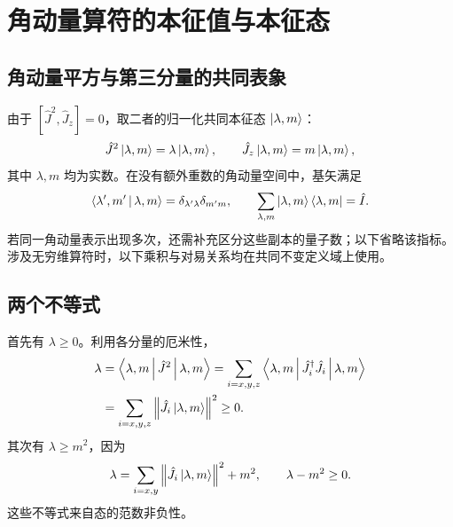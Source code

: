 \section{角动量算符的本征值与本征态}
\subsection{角动量平方与第三分量的共同表象}
由于 $\left[\hat J^2,\hat J_z\right]=0$，取二者的归一化共同本征态 $\Ket{\lambda,m}$：
\begin{equation}
\hat J^2\Ket{\lambda,m}=\lambda\Ket{\lambda,m},\qquad
\hat J_z\Ket{\lambda,m}=m\Ket{\lambda,m},
\end{equation}
其中 $\lambda,m$ 均为实数。在没有额外重数的角动量空间中，基矢满足
\begin{equation}
\Braket{\lambda',m'|\lambda,m}=\delta_{\lambda'\lambda}\delta_{m'm},\qquad
\sum_{\lambda,m}\Ket{\lambda,m}\Bra{\lambda,m}=\hat I.
\end{equation}
若同一角动量表示出现多次，还需补充区分这些副本的量子数；以下省略该指标。涉及无穷维算符时，以下乘积与对易关系均在共同不变定义域上使用。

\subsection{两个不等式}
首先有 $\lambda\geq0$。利用各分量的厄米性，
\begin{align}
\lambda&=\Braket{\lambda,m|\hat J^2|\lambda,m}
=\sum_{i=x,y,z}\Braket{\lambda,m|\hat J_i^\dag\hat J_i|\lambda,m}\notag\\
&=\sum_{i=x,y,z}\left\|\hat J_i\Ket{\lambda,m}\right\|^2\geq0.
\end{align}
其次有 $\lambda\geq m^2$，因为
\begin{equation}
\lambda=\sum_{i=x,y}\left\|\hat J_i\Ket{\lambda,m}\right\|^2+m^2,
\qquad\lambda-m^2\geq0.
\label{eq:angular-eigenvalue-bound}
\end{equation}
这些不等式来自态的范数非负性。

